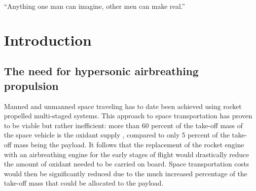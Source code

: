 \begin{chapterquote}
  ``Anything one man can imagine, other men can make real.''

\end{chapterquote}



\chapter{Introduction}


\section{The need for hypersonic airbreathing propulsion}

Manned and unmanned space traveling has to date been achieved using rocket propelled
multi-staged systems. This approach to space transportation has proven to be viable
but rather inefficient: more than 60 percent of the take-off mass of the space vehicle
is the oxidant supply \cite{book:1994:pratt}, compared to only 5 percent of the take-off
mass being the payload. It follows that the replacement of the rocket engine with an
airbreathing engine for the early stages of flight would drastically reduce the
amount of oxidant needed to be carried on board. Space transportation costs would
then be significantly reduced due to the much increased percentage of the take-off
mass that could be allocated to the payload.

